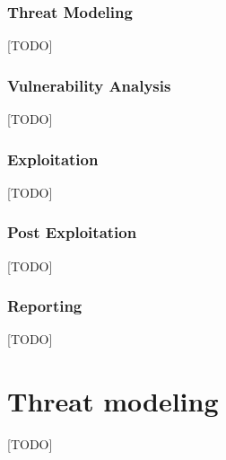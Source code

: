 \subsubsection{Threat Modeling}
[TODO]

\subsubsection{Vulnerability Analysis}
[TODO]

\subsubsection{Exploitation}
[TODO]

\subsubsection{Post Exploitation}
[TODO]

\subsubsection{Reporting}
[TODO]


\section{Threat modeling} \label{ch:method:threat-modeling}
[TODO]

